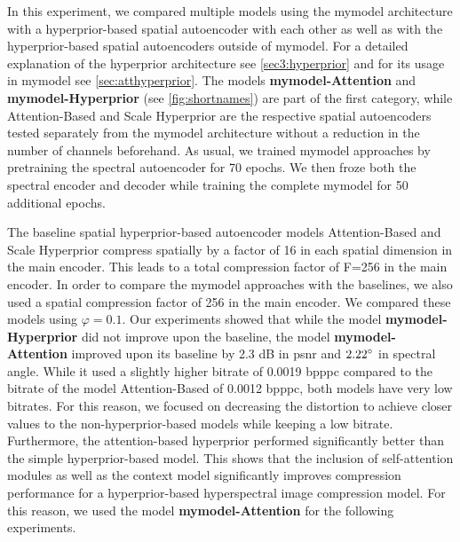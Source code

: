 In this experiment, we compared multiple models using the \ac{mymodel} architecture with a hyperprior-based spatial autoencoder with each other as well as with the hyperprior-based spatial autoencoders outside of \ac{mymodel}. For a detailed explanation of the hyperprior architecture see \autoref{sec3:hyperprior} and for its usage in \ac{mymodel} see \autoref{sec:atthyperprior}. The models \textbf{\ac{mymodel}-Attention} and \textbf{\ac{mymodel}-Hyperprior} (see \autoref{fig:shortnames}) are part of the first category, while Attention-Based and Scale Hyperprior are the respective spatial autoencoders tested separately from the \ac{mymodel} architecture without a reduction in the number of channels beforehand. As usual, we trained \ac{mymodel} approaches by pretraining the spectral autoencoder for 70 epochs. We then froze both the spectral encoder and decoder while training the complete \ac{mymodel} for 50 additional epochs.

The baseline spatial hyperprior-based autoencoder models Attention-Based \citep{cheng_learned_2020} and Scale Hyperprior \citep{balle_variational_2018} compress spatially by a factor of 16 in each spatial dimension in the main encoder. This leads to a total compression factor of F=256 in the main encoder. In order to compare the \ac{mymodel} approaches with the baselines, we also used a spatial compression factor of 256 in the main encoder. We compared these models using $\varphi=0.1$. Our experiments showed that while the model \textbf{\ac{mymodel}-Hyperprior} did not improve upon the baseline, the model \textbf{\ac{mymodel}-Attention} improved upon its baseline by 2.3 dB in \ac{psnr} and $2.22 \degree$ in spectral angle. While it used a slightly higher bitrate of 0.0019 \ac{bpppc} compared to the bitrate of the model Attention-Based of 0.0012 \ac{bpppc}, both models have very low bitrates. For this reason, we focused on decreasing the distortion to achieve closer values to the non-hyperprior-based models while keeping a low bitrate. Furthermore, the attention-based hyperprior performed significantly better than the simple hyperprior-based model. This shows that the inclusion of self-attention modules as well as the context model significantly improves compression performance for a hyperprior-based hyperspectral image compression model. For this reason, we used the model \textbf{\ac{mymodel}-Attention} for the following experiments.

